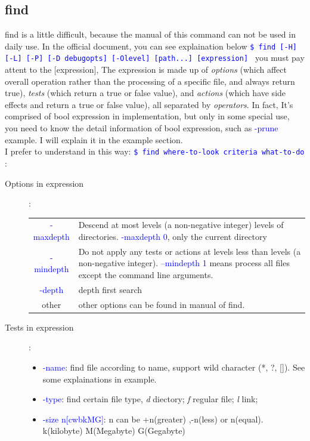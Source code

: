 \documentclass[a4paper,12pt,twoside]{book}
\newcommand{\linuxcommand}[1]{\texttt{\textcolor{blue}{\$ #1 \Pisymbol{psy}{191}}}}
\newcommand{\op}[1]{\textcolor{blue}{-#1}}
\begin{document}
\begin{CJK*}{UTF8}{song}
\section{find}
	find is a little difficult, because the manual of this command can not be used in daily use. In the official document, you can see explaination below \linuxcommand{find [-H] [-L] [-P] [-D debugopts] [-Olevel] [path...] [expression]} you must pay attent to the [expression], The expression is made up of \emph{options} (which affect overall operation rather than  the  processing  of  a  specific file,  and  always  return true), \emph{tests} (which return a true or false value), and \emph{actions} (which have side effects and return a true or false value), all separated by \emph{operators}. In fact, It's comprised of bool expression in implementation, but only in some special use, you need to know the detail information of bool expression, such as \op{prune} example. I will explain it in the example section. \\
	I prefer to understand in this way: \linuxcommand{find where-to-look criteria what-to-do}:
	\begin{description}
	\item[Options in expression]: \\
		\begin{tabular}{c|p{}}
		\hline
		\op{maxdepth} & Descend at most levels (a non-negative integer) levels of directories.  \op{maxdepth 0}, only the current directory \\
		\op{mindepth} & Do not apply any tests or actions at levels less than levels (a non-negative integer). \op{-mindepth  1}  means process all files except the command line arguments. \\
		\op{depth} & depth first search \\
		other & other options can be found in manual of find. \\
		\hline
		\end{tabular}
	\item[Tests in expression]:
		\begin{itemize}
		\item \op{name}: find file according to name, support wild character (*, ?, []). See some explainations in example.
		\item \op{type}: find certain file type, \emph{d} diectory; \emph{f} regular file; \emph{l} link;
		\item \op{size n[cwbkMG]}: n can be +n(greater) ,-n(less) or n(equal). k(kilobyte) M(Megabyte) G(Gegabyte)

\end{itemize}
\end{description}
\end{CJK*}
\end{document}
